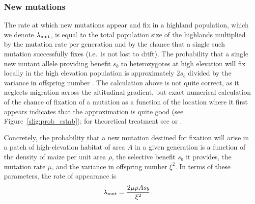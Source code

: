 \subsubsection{New mutations}
The rate at which new mutations appear and fix in a highland population, which we denote $\lambda_{\text{mut}}$, is equal to the total population size of the highlands multiplied by the mutation rate per generation and by the chance that a single such mutation successfully fixes (i.e.\ is not lost to drift).
The probability that a single new mutant allele providing benefit $s_b$ to heterozygotes at high elevation will fix locally in the high elevation population is approximately $2s_b$ divided by the variance in offspring number \citep{jagers1975branching}.
The calculation above is not quite correct, as it neglects migration across the altitudinal gradient, but exact numerical calculation of the chance of fixation of a mutation as a function of the location where it first appears indicates that the approximation is quite good (see Figure~\ref{sfig:prob_estab}); for theoretical treatment see \citet{pollak1966survival} or \citet{barton1987establishment}.


Concretely, the probability that a new mutation destined for fixation will arise in a patch of high-elevation habitat of area $A$ in a given generation is a function of the density of maize per unit area $\rho$, the selective benefit $s_b$ it provides, the mutation rate $\mu$, and the variance in offspring number $\xi^2$.
In terms of these parameters, the rate of appearance is 
\begin{align} \label{eqn:mutrate}
  \lambda_{\text{mut}} = \frac{2 \mu \rho A s_b}{\xi^2} .
\end{align}

